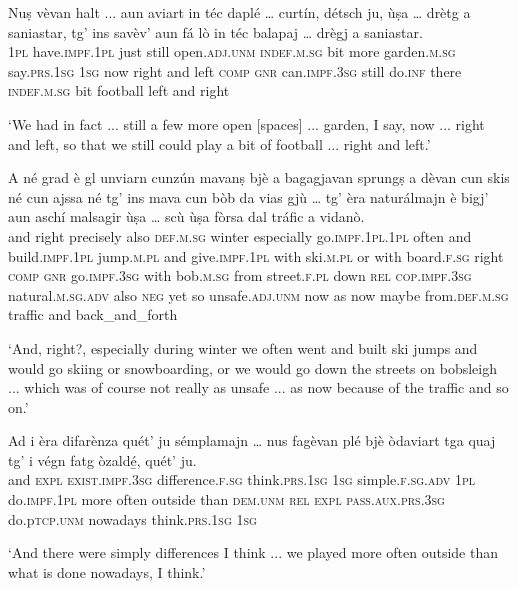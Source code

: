 \begin{linenumbers}
	\gll  Nuṣ vèvan halt ... aun aviart in téc daplé … curtín, détsch ju, ùṣa … drètg a saniastar, tg’ ins savèv’ aun fá lò in téc balapaj … drègj a saniastar.  \\
	\textsc{1pl} have.\textsc{impf.1pl} just {} still open.\textsc{adj.unm} \textsc{indef.m.sg} bit more {} garden.\textsc{m.sg} say.\textsc{prs.1sg} \textsc{1sg} now {} right and left \textsc{comp} \textsc{gnr} can.\textsc{impf.3sg} still do.\textsc{inf} there \textsc{indef.m.sg} bit football {} left and right\\
\end{linenumbers}
\medskip
\glt `We had in fact ... still a few more open [spaces] ... garden, I say, now ... right and left, so that we still could play a bit of football ... right and left.'
\medskip

\begin{linenumbers}
	\gll A né grad è gl unviarn cunzún mavanṣ bjè a bagagjavan sprungṣ a dèvan cun skis né cun ajssa né tg’ ins mava cun bòb da vias gjù … tg’ èra naturálmajn è bigj' aun aschí malsagir ùṣa … scù ùṣa fòrsa dal tráfic a vidanò.\\
	and right precisely also \textsc{def.m.sg} winter especially go.\textsc{impf.1pl.1pl} often and build.\textsc{impf.1pl} jump.\textsc{m.pl} and give.\textsc{impf.1pl} with ski.\textsc{m.pl} or with board.\textsc{f.sg} right \textsc{comp} \textsc{gnr} go.\textsc{impf.3sg} with bob.\textsc{m.sg} from street.\textsc{f.pl} down {} \textsc{rel} \textsc{cop.impf.3sg} natural.\textsc{m.sg.adv} also \textsc{neg} yet so unsafe.\textsc{adj.unm} now {} as now maybe from.\textsc{def.m.sg} traffic and back\_and\_forth\\
\end{linenumbers}   
\medskip
\glt `And, right?, especially during winter we often went and built ski jumps and would go skiing or snowboarding, or we would go down the streets on bobsleigh ... which was of course not really as unsafe ... as now because of the traffic and so on.'
\medskip

\begin{linenumbers}
	\gll Ad i èra difarènza quét’ ju sémplamajn … nus fagèvan plé bjè òdaviart tga quaj tg’ i végn fatg òzaldé̱, quét’ ju.   \\
	and \textsc{expl} \textsc{exist.impf.3sg} difference.\textsc{f.sg} think.\textsc{prs.1sg} \textsc{1sg} simple.\textsc{f.sg.adv} {} \textsc{1pl} do.\textsc{impf.1pl} more often outside than \textsc{dem.unm} \textsc{rel} \textsc{expl} \textsc{pass.aux.prs.3sg} do.p\textsc{tcp.unm} nowadays think.\textsc{prs.1sg} \textsc{1sg}\\
\end{linenumbers}
\smallskip
\glt `And there were simply differences I think ... we played more often outside than what is done nowadays, I think.'
\medskip

